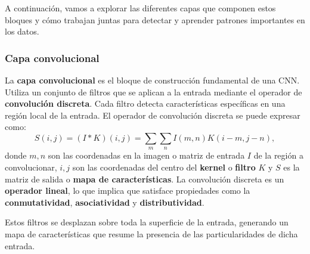 A continuación, vamos a explorar las diferentes capas que componen estos bloques y cómo trabajan juntas para detectar y aprender patrones importantes en los datos.

\subsubsection{Capa convolucional}

La \textbf{capa convolucional} es el bloque de construcción fundamental de una CNN. Utiliza un conjunto de filtros que se aplican a la entrada mediante el operador de \textbf{convolución discreta}. Cada filtro detecta características específicas en una región local de la entrada. El operador de convolución discreta se puede expresar como:
\begin{equation}
	S(i, j) = (I \ast K)(i, j) = \sum_m \sum_n I(m, n) K(i-m, j-n),
\end{equation}
donde $m,n$ son las coordenadas en la imagen o matriz de entrada \(I\) de la región a convolucionar, $i,j$ son las coordenadas del centro del \textbf{kernel} o \textbf{filtro} \(K\) y \(S\) es la matriz de salida o \textbf{mapa de características}. La convolución discreta es un \textbf{operador lineal}, lo que implica que satisface propiedades como la \textbf{conmutatividad}, \textbf{asociatividad} y \textbf{distributividad}.

Estos filtros se desplazan sobre toda la superficie de la entrada, generando un mapa de características que resume la presencia de las particularidades de dicha entrada.

